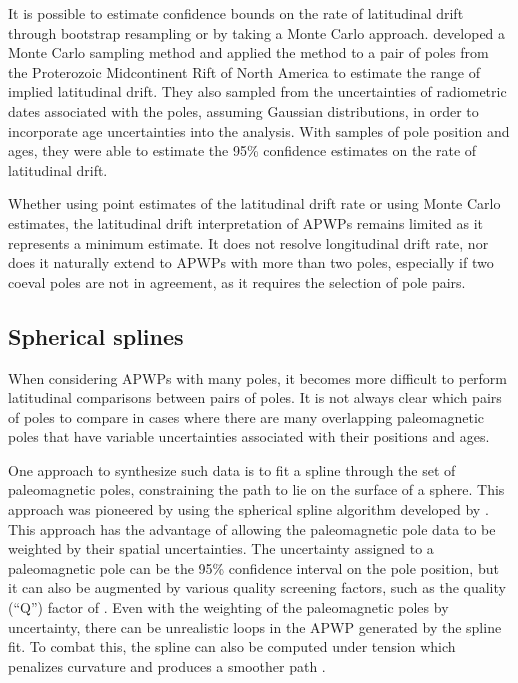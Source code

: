\documentclass[11pt,letterpaper]{article}
\begin{document}
It is possible to estimate confidence bounds on the rate of latitudinal drift through bootstrap resampling \citep[e.g.][]{Tarduno1990b} or by taking a Monte Carlo approach. \cite{Swanson-Hysell2014b} developed a Monte Carlo sampling method and applied the method to a pair of poles from the Proterozoic Midcontinent Rift of North America to estimate the range of implied latitudinal drift. They also sampled from the uncertainties of radiometric dates associated with the poles, assuming Gaussian distributions, in order to incorporate age uncertainties into the analysis. With samples of pole position and ages, they were able to estimate the 95\% confidence estimates on the rate of latitudinal drift.

Whether using point estimates of the latitudinal drift rate or using Monte Carlo estimates, the latitudinal drift interpretation of APWPs remains limited as it represents a minimum estimate. It does not resolve longitudinal drift rate, nor does it naturally extend to APWPs with more than two poles, especially if two coeval poles are not in agreement, as it requires the selection of pole pairs.

\subsection*{Spherical splines}
When considering APWPs with many poles, it becomes more difficult to perform latitudinal comparisons between pairs of poles. It is not always clear which pairs of poles to compare in cases where there are many overlapping paleomagnetic poles that have variable uncertainties associated with their positions and ages.

One approach to synthesize such data is to fit a spline through the set of paleomagnetic poles, constraining the path to lie on the surface of a sphere. This approach was pioneered by \cite{Torsvik1992a} using the spherical spline algorithm developed by \cite{Jupp1987a}. This approach has the advantage of allowing the paleomagnetic pole data to be weighted by their spatial uncertainties. The uncertainty assigned to a paleomagnetic pole can be the 95\% confidence interval on the pole position, but it can also be augmented by various quality screening factors, such as the quality (``Q'') factor of \cite{Van-der-Voo1990a} \citep{Torsvik1992a}. Even with the weighting of the paleomagnetic poles by uncertainty, there can be unrealistic loops in the APWP generated by the spline fit. To combat this, the spline can also be computed under tension which penalizes curvature and produces a smoother path \citep{Torsvik1996a}.
\end{document}
